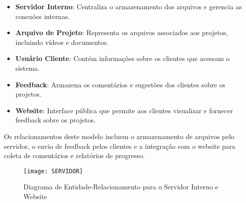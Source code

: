 \begin{itemize}
    \item \textbf{Servidor Interno}: Centraliza o armazenamento dos arquivos e gerencia as conexões internas.
    \item \textbf{Arquivo de Projeto}: Representa os arquivos associados aos projetos, incluindo vídeos e documentos.
    \item \textbf{Usuário Cliente}: Contém informações sobre os clientes que acessam o sistema.
    \item \textbf{Feedback}: Armazena os comentários e sugestões dos clientes sobre os projetos.
    \item \textbf{Website}: Interface pública que permite aos clientes visualizar e fornecer feedback sobre os projetos.
\end{itemize}

Os relacionamentos deste modelo incluem o armazenamento de arquivos pelo servidor, o envio de feedback pelos clientes e a integração com o website para coleta de comentários e relatórios de progresso.

\begin{figure}[ht]
    \centering
    \texttt{[image: SERVIDOR]}
    \caption{Diagrama de Entidade-Relacionamento para o Servidor Interno e Website}
    \label{fig:servidor}
\end{figure}

